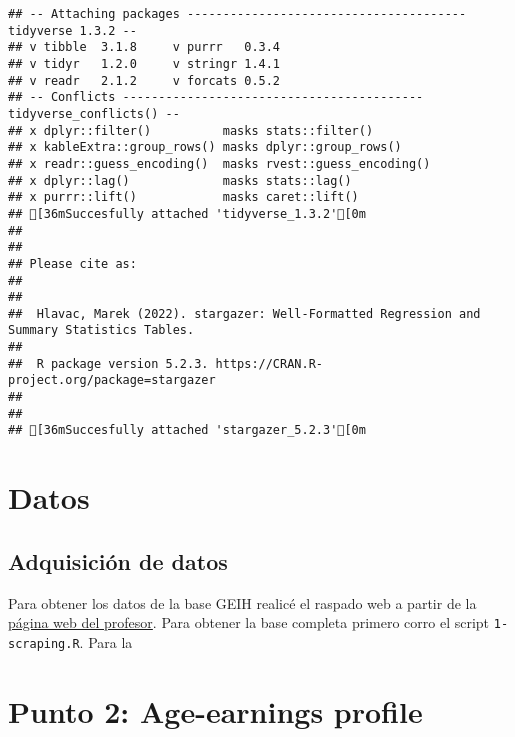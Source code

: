 \documentclass[
]{article}
\begin{document}
\begin{verbatim}
## -- Attaching packages --------------------------------------- tidyverse 1.3.2 --
## v tibble  3.1.8     v purrr   0.3.4
## v tidyr   1.2.0     v stringr 1.4.1
## v readr   2.1.2     v forcats 0.5.2
## -- Conflicts ------------------------------------------ tidyverse_conflicts() --
## x dplyr::filter()          masks stats::filter()
## x kableExtra::group_rows() masks dplyr::group_rows()
## x readr::guess_encoding()  masks rvest::guess_encoding()
## x dplyr::lag()             masks stats::lag()
## x purrr::lift()            masks caret::lift()
## [36mSuccesfully attached 'tidyverse_1.3.2'[0m
## 
## 
## Please cite as: 
## 
## 
##  Hlavac, Marek (2022). stargazer: Well-Formatted Regression and Summary Statistics Tables.
## 
##  R package version 5.2.3. https://CRAN.R-project.org/package=stargazer 
## 
## 
## [36mSuccesfully attached 'stargazer_5.2.3'[0m
\end{verbatim}

\hypertarget{datos}{%
\section{Datos}\label{datos}}

\hypertarget{adquisiciuxf3n-de-datos}{%
\subsection{Adquisición de datos}\label{adquisiciuxf3n-de-datos}}

Para obtener los datos de la base GEIH realicé el raspado web a partir
de la
\href{https://ignaciomsarmiento.github.io/GEIH2018\%20sample/}{página
web del profesor}. Para obtener la base completa primero corro el script
\texttt{1-scraping.R}. Para la

\hypertarget{punto-2-age-earnings-profile}{%
\section{Punto 2: Age-earnings
profile}\label{punto-2-age-earnings-profile}}
\end{document}
